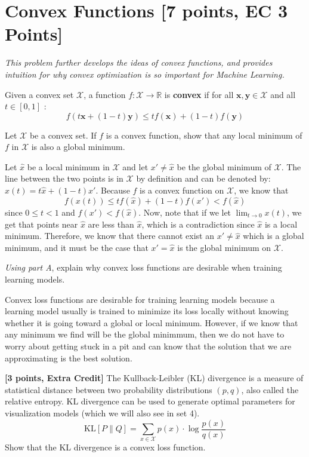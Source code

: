 
\newpage
\section{Convex Functions [7 points, EC 3 Points]}

\emph{This problem further develops the ideas of convex functions, and provides intuition for why convex optimization is so important for
 Machine Learning.}

Given a convex set $\mathcal{X}$, a function $f:\mathcal{X}\to\mathbb{R}$ is \textbf{convex} if for all $\textbf{x},\textbf{y}\in \mathcal{X}$ and all $t\in[0,1]$ :
\[f(t\textbf{x} + (1-t)\textbf{y}) \leq tf(\textbf{x}) + (1-t)f(\textbf{y})\]

\begin{problem}[3]
Let $\mathcal{X}$ be a convex set. If $f$ is a convex function, show that any local minimum of $f$ in $\mathcal{X}$ is also a global minimum.
\end{problem}

\begin{solution}
    Let $\hat{x}$ be a local minimum in $\mathcal{X}$ and let $x' \neq \hat{x}$ be the global minimum of $\mathcal{X}$. The line between the two points is in $\mathcal{X}$ by definition and can be denoted by: $x(t) = t\hat{x} + (1 - t)x'$. Because $f$ is a convex function on $\mathcal{X}$, we know that $$ f(x(t)) \leq tf(\hat{x}) + (1 - t)f(x') < f(\hat{x}) $$ since $ 0 \leq t < 1$ and $f(x') < f(\hat{x})$. Now, note that if we let $\lim_{t \to 0} x(t)$, we get that points near $\hat{x}$ are less than $\hat{x}$, which is a contradiction since $\hat{x}$ is a local minimum. Therefore, we know that there cannot exist an $x' \neq \hat{x}$ which is a global minimum, and it must be the case that $x' = \hat{x}$ is the global minimum on $\mathcal{X}$.
\end{solution}

\begin{problem}[4]
\emph{Using part A}, explain why convex loss functions are desirable when training learning models.
\end{problem}

\begin{solution}
    Convex loss functions are desirable for training learning models because a learning model usually is trained to minimize its loss locally without knowing whether it is going toward a global or local minimum. However, if we know that any minimum we find will be the global minimmum, then we do not have to worry about getting stuck in a pit and can know that the solution that we are approximating is the best solution.
\end{solution}
\problem\textbf{[3 points, Extra Credit] }
The Kullback-Leibler (KL) divergence is a measure of statistical distance between two probability distributions $(p, q)$, also called the relative entropy. KL divergence can be used to generate optimal parameters for visualization models (which we will also see in set 4).
\[\mathrm{KL}[P\|Q] = \sum_{x\in\mathcal{X}} p(x) \cdot \log \frac{p(x)}{q(x)}\]
Show that the KL divergence is a convex loss function. \\

